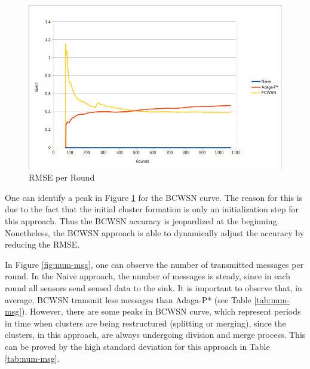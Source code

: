 \documentclass{acm_proc_article-sp}
\begin{document}
\begin{figure}[!htb]
\centering
	\includegraphics[scale=0.33]{FCWSN-RMSExRound02-SD1.png}
    \caption{RMSE per Round}
    \label{fig:rmse}
\end{figure}

One can identify a peak in Figure \ref{fig:rmse} for the BCWSN curve. The reason
for this is due to the fact that the initial cluster formation is only an
initialization step for this approach.
Thus the BCWSN accuracy is jeopardized at the beginning. Nonetheless, the
BCWSN approach is able to dynamically adjust the accuracy by reducing the RMSE.

In Figure \ref{fig:num-msg}, one can observe the number of transmitted messages
per round. In the Naive approach, the number of messages is steady, since in
each round all sensors send sensed data to the sink. It is important to observe
that, in average, BCWSN transmit less messages than Adaga-P* (see Table
\ref{tab:num-msg}). However, there are some peaks in BCWSN curve, which
represent periods in time when clusters are being restructured (splitting or
merging), since the clusters, in this approach, are always undergoing division
and merge process. This can be proved by the high standard deviation for this
approach in Table \ref{tab:num-msg}.
\end{document}
